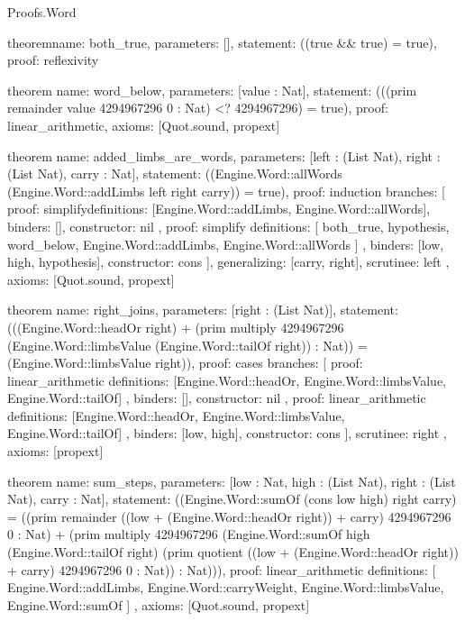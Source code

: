 \begin{lexlean}{Proofs.Word}
\begin{semanticmodule}
theorem{name: both_true, parameters: [], statement: ((true && true) = true), proof: reflexivity{}}

theorem{
  name: word_below,
  parameters: [value : Nat],
  statement: (((prim remainder value 4294967296 0 : Nat) <? 4294967296) = true),
  proof: linear_arithmetic{},
  axioms: [Quot.sound, propext]
}

theorem{
  name: added_limbs_are_words,
  parameters: [left : (List Nat), right : (List Nat), carry : Nat],
  statement: ((Engine.Word::allWords (Engine.Word::addLimbs left right carry)) = true),
  proof: induction{
    branches: [
      {
        proof: simplify{definitions: [Engine.Word::addLimbs, Engine.Word::allWords]},
        binders: [],
        constructor: nil
      },
      {
        proof: simplify{
          definitions: [
            both_true,
            hypothesis,
            word_below,
            Engine.Word::addLimbs,
            Engine.Word::allWords
          ]
        },
        binders: [low, high, hypothesis],
        constructor: cons
      }
    ],
    generalizing: [carry, right],
    scrutinee: left
  },
  axioms: [Quot.sound, propext]
}

theorem{
  name: right_joins,
  parameters: [right : (List Nat)],
  statement: (((Engine.Word::headOr right) + (prim multiply 4294967296 (Engine.Word::limbsValue (Engine.Word::tailOf right)) : Nat)) = (Engine.Word::limbsValue right)),
  proof: cases{
    branches: [
      {
        proof: linear_arithmetic{
          definitions: [Engine.Word::headOr, Engine.Word::limbsValue, Engine.Word::tailOf]
        },
        binders: [],
        constructor: nil
      },
      {
        proof: linear_arithmetic{
          definitions: [Engine.Word::headOr, Engine.Word::limbsValue, Engine.Word::tailOf]
        },
        binders: [low, high],
        constructor: cons
      }
    ],
    scrutinee: right
  },
  axioms: [propext]
}

theorem{
  name: sum_steps,
  parameters: [low : Nat, high : (List Nat), right : (List Nat), carry : Nat],
  statement: ((Engine.Word::sumOf (cons low high) right carry) = ((prim remainder ((low + (Engine.Word::headOr right)) + carry) 4294967296 0 : Nat) + (prim multiply 4294967296 (Engine.Word::sumOf high (Engine.Word::tailOf right) (prim quotient ((low + (Engine.Word::headOr right)) + carry) 4294967296 0 : Nat)) : Nat))),
  proof: linear_arithmetic{
    definitions: [
      Engine.Word::addLimbs,
      Engine.Word::carryWeight,
      Engine.Word::limbsValue,
      Engine.Word::sumOf
    ]
  },
  axioms: [Quot.sound, propext]
}


\end{semanticmodule}
\end{lexlean}
